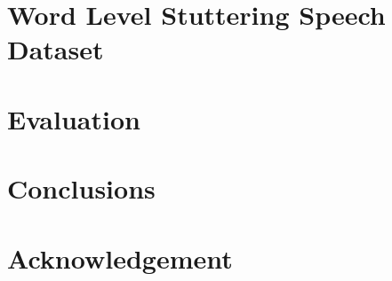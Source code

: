 \documentclass{article}
\begin{document}
\section{Word Level Stuttering Speech Dataset}
\label{sec:dataset}


\section{Evaluation}
\label{sec:evaluation}


% 

% 

\vspace{-12pt}
\section{Conclusions}
\label{sec:conclusion}
\vspace{-5pt}


\vspace{-14pt}
\section{Acknowledgement}
\label{sec:ack}
\vspace{-10pt}






\end{document}
